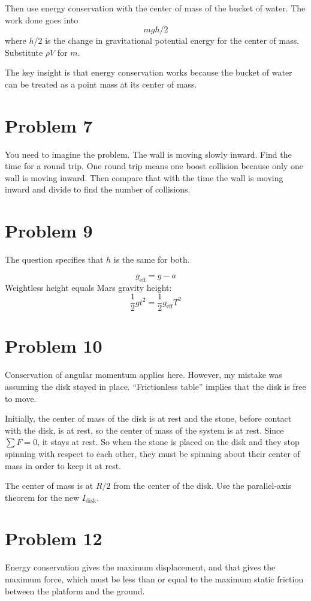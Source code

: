 \documentclass[11pt]{article}
\begin{document}
Then use energy conservation with the center of mass of the bucket of water. The work done goes into
\[
mgh/2
\]
where $h/2$ is the change in gravitational potential energy for the center of mass. Substitute $\rho V$ for $m$.

The key insight is that energy conservation works because the bucket of water can be treated as a point mass at its center of mass.

\section*{Problem 7}
\hspace*{\parindent} You need to imagine the problem. The wall is moving slowly inward. Find the time for a round trip. One round trip means one boost collision because only one wall is moving inward. Then compare that with the time the wall is moving inward and divide to find the number of collisions.

\section*{Problem 9}
\hspace*{\parindent} The question specifies that $h$ is the same for both.

\[
g_{\mathrm{eff}}=g-a
\]
Weightless height equals Mars gravity height:
\[
\frac12 gt^2=\frac12 g_{\mathrm{eff}}T^2
\]

\section*{Problem 10}
\hspace*{\parindent} Conservation of angular momentum applies here. However, my mistake was assuming the disk stayed in place. ``Frictionless table'' implies that the disk is free to move.

Initially, the center of mass of the disk is at rest and the stone, before contact with the disk, is at rest, so the center of mass of the system is at rest. Since $\sum F=0$, it stays at rest. So when the stone is placed on the disk and they stop spinning with respect to each other, they must be spinning about their center of mass in order to keep it at rest.

The center of mass is at $R/2$ from the center of the disk. Use the parallel-axis theorem for the new $I_{\text{disk}}$.

\section*{Problem 12}
\hspace*{\parindent} Energy conservation gives the maximum displacement, and that gives the maximum force, which must be less than or equal to the maximum static friction between the platform and the ground.
\end{document}
